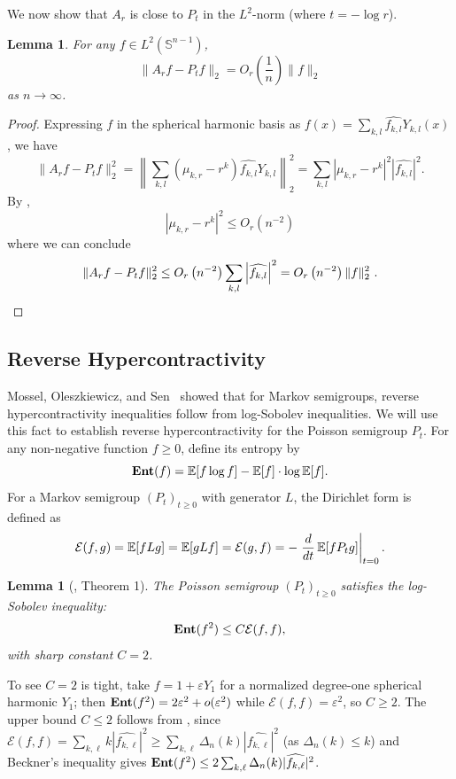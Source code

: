 \documentclass[11pt]{article}
\newtheorem{lemma}[theorem]{Lemma}
\newcommand{\E}{\mathop{\mathbb E\/}}
\newcommand{\Ent}{\mathop{\bf Ent\/}}
\newcommand{\sn}{{\mathbb{S}^{n-1} }}
\begin{document}
We now show that \( A_r \) is close to \( P_t \) in the \( L^2 \)-norm (where $t = -\log r$).

\begin{lemma}
\label{lem: equivalence of A and P}
    For any \( f \in L^2(\sn) \),
    \[
    \| A_r f - P_t f \|_2 = O_r\left(\frac{1}{n}\right) \| f \|_2
    \]
    as \( n \to \infty \).
\end{lemma}

\begin{proof}
    Expressing \( f \) in the spherical harmonic basis as \( f(x) = \sum_{k,l} \widehat{f_{k,l}} Y_{k,l}(x) \), we have
    \[
    \| A_r f - P_t f \|_2^2 = \left\| \sum_{k,l} (\mu_{k,r} - r^k) \widehat{f_{k,l}} Y_{k,l} \right\|_2^2 = \sum_{k,l} |\mu_{k,r} - r^k|^2 \left| \widehat{f_{k,l}}\right|^2.
    \]
    By ,
    \[
    |\mu_{k,r} - r^k|^2 \leq O_r(n^{-2})
    \]
    where we can conclude
    \[
    \| A_r f - P_t f \|_2^2 \leq O_r\left(n^{-2}\right) \sum_{k,l} \left| \widehat{f_{k,l}} \right|^2 = O_r\left(n^{-2}\right) \| f \|_2^2\ . \qedhere
    \]
\end{proof}

\subsection{Reverse Hypercontractivity}

Mossel, Oleszkiewicz, and Sen~\cite{mossel2013reverse} showed that for Markov semigroups, reverse hypercontractivity inequalities follow from log-Sobolev inequalities. We will use this fact to establish reverse hypercontractivity for the Poisson semigroup \( P_t \). For any non-negative function \( f \geq 0 \), define its entropy by
\[
\Ent(f) = \E[f \log f] - \E[f] \cdot \log \E[f].
\]
For a Markov semigroup \( (P_t)_{t \geq 0} \) with generator \( L \), the Dirichlet form is defined as
\[
\mathcal{E}(f, g) = \E[f L g] = \E[g L f] = \mathcal{E}(g, f) = -\left. \frac{d}{dt} \E[f P_t g] \right|_{t = 0}.
\]

\begin{lemma}[\cite{beckner1992sobolev}, Theorem 1]
\label{lem: log-Sobolev of P}
The Poisson semigroup \( (P_t)_{t \geq 0} \) satisfies the log-Sobolev inequality:
\[
\Ent(f^2) \leq C \mathcal{E}(f, f),
\]
with sharp constant \( C = 2 \).
\end{lemma}
To see $C=2$ is tight, take \( f = 1 + \varepsilon Y_1 \) for a normalized degree-one spherical harmonic \( Y_1 \); then \( \Ent(f^2) = 2\varepsilon^2 + o(\varepsilon^2) \) while \( \mathcal{E}(f,f) = \varepsilon^2 \), so \( C \geq 2 \). The upper bound \( C \leq 2 \) follows from \cite{beckner1992sobolev}, since \( \mathcal{E}(f,f) = \sum_{k,\ell} k|\widehat{f_{k,\ell}}|^2 \geq \sum_{k,\ell} \Delta_n(k)|\widehat{f_{k,\ell}}|^2 \) (as \( \Delta_n(k) \leq k \)) and Beckner's inequality gives \( \Ent(f^2) \leq 2\sum_{k,\ell}\Delta_n(k)|\widehat{f_{k,\ell}}|^2 \).
\end{document}
